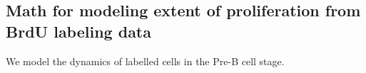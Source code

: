 \documentclass[11pt]{article} %
\newcommand{\gray}[1]{{\color{mygray}{#1}}}
\begin{document}
\pagestyle{fancy}
\fancyhf{}
\rhead{\textit{\gray{}}}

\subsection*{Math for modeling extent of proliferation from BrdU labeling data}

\vspace{0.4cm}


We model the dynamics of labelled cells in the Pre-B cell stage.
\end{document}
